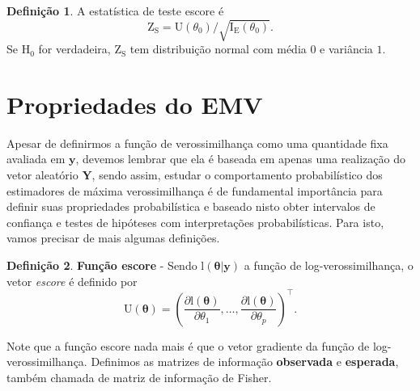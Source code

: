 \documentclass[
  9pt,
  a5paper,
]{book}
\theoremstyle{definition}
\newtheorem{definition}{Definição}[chapter]
\theoremstyle{definition}
\theoremstyle{definition}
\theoremstyle{definition}
\theoremstyle{remark}
\begin{document}
\begin{definition}
\protect\hypertarget{def:unnamed-chunk-21}{}\label{def:unnamed-chunk-21}A estatística de teste escore é
\[ \mathrm{Z_S} = \mathrm{U}(\theta_0)/ \sqrt{\mathrm{I_E}(\theta_0)}. \]
Se \(\mathrm{H_0}\) for verdadeira, \(\mathrm{Z_S}\) tem distribuição normal com média \(0\) e variância \(1\).
\end{definition}

\hypertarget{propriedades-do-emv}{%
\section{Propriedades do EMV}\label{propriedades-do-emv}}

Apesar de definirmos a função de verossimilhança como uma quantidade fixa avaliada em \(\mathbf{y}\), devemos lembrar que ela é baseada em apenas uma realização do vetor aleatório \(\mathbf{Y}\), sendo assim, estudar o comportamento probabilístico dos estimadores de máxima verossimilhança é de fundamental importância para definir suas propriedades probabilística e baseado nisto obter intervalos de confiança e testes de hipóteses com interpretações probabilísticas. Para isto, vamos precisar de mais algumas definições.

\begin{definition}
\protect\hypertarget{def:fcesc}{}\label{def:fcesc}\textbf{Função escore} - Sendo \(\mathrm{l}(\boldsymbol{\theta}|\mathbf{y})\) a função de log-verossimilhança, o vetor \emph{escore} é definido por
\[ \mathrm{U}(\boldsymbol{\theta}) = \left( \frac{\partial \mathrm{l}(\boldsymbol{\theta})}{\partial \theta_1}, \ldots, \frac{\partial \mathrm{l}(\boldsymbol{\theta})}{\partial \theta_p}\right)^\top. \]
\end{definition}

Note que a função escore nada mais é que o vetor gradiente da função de log-verossimilhança.
Definimos as matrizes de informação \textbf{observada} e \textbf{esperada}, também chamada de matriz de informação de Fisher.
\end{document}
